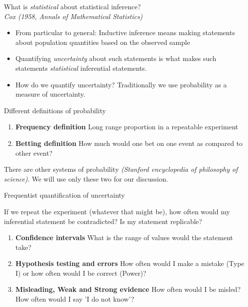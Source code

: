 \documentclass[10pt]{beamer}
\begin{document}
\begin{frame}[plain,c]
\begin{center}
\LARGE{What is \alert {\emph{statistical}} about statistical inference?}\\ 
\small \textit{Cox (1958, Annals of Mathematical Statistics)}
\end{center}
\begin{itemize}
\item From particular to general: Inductive inference means making statements about population quantities based on the observed sample 
\pause
\item Quantifying \alert{\emph{uncertainty}} about such statements is what makes such statements \emph{statistical} inferential statements.
\pause
\item How do we quantify uncertainty? Traditionally we use probability as a measure of uncertainty. 
\end{itemize}
\end{frame}

\begin{frame}
\begin{center}
\LARGE {Different definitions of probability}
\end{center}
\begin{enumerate}
\item \textbf{Frequency definition} Long range proportion in a repeatable experiment
\pause
\item \textbf{Betting definition} How much would one bet on one event as compared to other event? 
\pause
\end{enumerate} 
There are other systems of probability \textit{(Stanford encyclopedia of philosophy of science)}. We will use only these two for our discussion.
\end{frame}

\begin{frame}
\begin{center}
\LARGE {Frequentist quantification of uncertainty}
\end{center}
If we repeat the experiment (whatever that might be), how often would my inferential statement be contradicted? Is my statement replicable? 
\begin{enumerate}
\item \textbf{Confidence intervals} What is the range of values would the statement take?
\pause
\item \textbf{Hypothesis testing and errors} How often would I make a mistake (Type I) or how often would I be correct (Power)?
\pause
\item \textbf{Misleading, Weak and Strong evidence} How often would I be misled? How often would I say 'I do not know'?
\end{enumerate} 
\end{frame}
\end{document}
